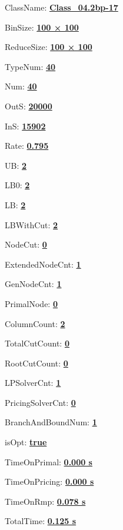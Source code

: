 \documentclass[11pt]{article}
\begin{document}
\pagestyle{empty}


ClassName: \underline{\textbf{Class_04.2bp-17}}
\par
BinSize: \underline{\textbf{100 × 100}}
\par
ReduceSize: \underline{\textbf{100 × 100}}
\par
TypeNum: \underline{\textbf{40}}
\par
Num: \underline{\textbf{40}}
\par
OutS: \underline{\textbf{20000}}
\par
InS: \underline{\textbf{15902}}
\par
Rate: \underline{\textbf{0.795}}
\par
UB: \underline{\textbf{2}}
\par
LB0: \underline{\textbf{2}}
\par
LB: \underline{\textbf{2}}
\par
LBWithCut: \underline{\textbf{2}}
\par
NodeCut: \underline{\textbf{0}}
\par
ExtendedNodeCnt: \underline{\textbf{1}}
\par
GenNodeCnt: \underline{\textbf{1}}
\par
PrimalNode: \underline{\textbf{0}}
\par
ColumnCount: \underline{\textbf{2}}
\par
TotalCutCount: \underline{\textbf{0}}
\par
RootCutCount: \underline{\textbf{0}}
\par
LPSolverCnt: \underline{\textbf{1}}
\par
PricingSolverCnt: \underline{\textbf{0}}
\par
BranchAndBoundNum: \underline{\textbf{1}}
\par
isOpt: \underline{\textbf{true}}
\par
TimeOnPrimal: \underline{\textbf{0.000 s}}
\par
TimeOnPricing: \underline{\textbf{0.000 s}}
\par
TimeOnRmp: \underline{\textbf{0.078 s}}
\par
TotalTime: \underline{\textbf{0.125 s}}
\par
\newpage
\end{document}
